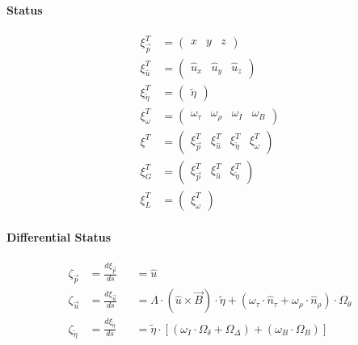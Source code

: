 \documentclass[review]{elsarticle}
\begin{document}
\paragraph{Status}
\begin{equation} \begin{alignedat}{-1}
    \xi_{\vec{p}}^{T}&=\left(\begin{array}{ccc}
        x & y & z
    \end{array}\right) \\
    \xi_{\hat{u}}^{T}&=\left(\begin{array}{ccc}
        {\hat{u}}_{x} & {\hat{u}}_{y} & {\hat{u}}_{z}
    \end{array}\right) \\
    \xi_{\tilde{\eta}}^{T}&=\left(\begin{array}{c}
        \tilde{\eta}
    \end{array}\right) \\
    \xi_{\omega}^{T}&=\left(\begin{array}{cccc}
        \omega_{\tau} & \omega_{\rho} & \omega_{I} & \omega_{B}
    \end{array}\right) \\
    \xi^{T}&=\left(\begin{array}{cccc}
        \xi_{\vec{p}}^{T} & \xi_{\hat{u}}^{T} & \xi_{\tilde{\eta}}^{T} & \xi_{\omega}^{T}
    \end{array}\right) \\
    \xi_{G}^{T}&=\left(\begin{array}{ccc}
        \xi_{\vec{p}}^{T} & \xi_{\hat{u}}^{T} & \xi_{\tilde{\eta}}^{T}
    \end{array}\right) \\
    \xi_{L}^{T}&=\left(\begin{array}{c}
        \xi_{\omega}^{T}
    \end{array}\right)
\end{alignedat} \end{equation} 

\paragraph{Differential Status}
\begin{equation} \begin{alignedat}{-1}
    \zeta_{\vec{p}}&=\frac{d\xi_{\vec{p}}}{ds}&&=\hat{u} \\
    \zeta_{\vec{u}}&=\frac{d\xi_{\vec{u}}}{ds}&&=\Lambda\cdot(\hat{u}\times\vec{B})\cdot\tilde{\eta}+(\omega_{\tau}\cdot\hat{n}_{\tau}+\omega_{\rho}\cdot\hat{n}_{\rho})\cdot\Omega_{\theta} \\
    \zeta_{\tilde{\eta}}&=\frac{d\xi_{\tilde{\eta}}}{ds}&&=\tilde{\eta}\cdot\left[\left(\omega_{I}\cdot\Omega_{\delta}+\Omega_{\Delta}\right)+\left(\omega_{B}\cdot\Omega_{B}\right)\right]
\end{alignedat} \end{equation} 
\end{document}
